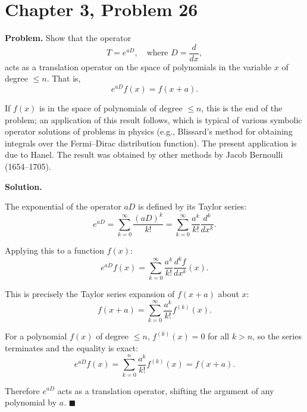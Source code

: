 \documentclass[12pt]{article}
\begin{document}
\section*{Chapter 3, Problem 26}

\textbf{Problem.} Show that the operator
\[
T = e^{aD}, \quad \text{where } D = \frac{d}{dx},
\]
acts as a translation operator on the space of polynomials in the variable $x$ of degree $\le n$. That is,
\[
e^{aD}f(x) = f(x + a).
\]

If $f(x)$ is in the space of polynomials of degree $\le n$, this is the end of the problem; an application of this result follows, which is typical of various symbolic operator solutions of problems in physics (e.g., Blissard's method for obtaining integrals over the Fermi--Dirac distribution function). The present application is due to Hanel. The result was obtained by other methods by Jacob Bernoulli (1654--1705).

\bigskip
\textbf{Solution.}

The exponential of the operator $aD$ is defined by its Taylor series:
\[
e^{aD} = \sum_{k=0}^{\infty} \frac{(aD)^k}{k!} = \sum_{k=0}^{\infty} \frac{a^k}{k!}\frac{d^k}{dx^k}.
\]

Applying this to a function $f(x)$:
\[
e^{aD}f(x) = \sum_{k=0}^{\infty} \frac{a^k}{k!}\frac{d^k f}{dx^k}(x).
\]

This is precisely the Taylor series expansion of $f(x+a)$ about $x$:
\[
f(x + a) = \sum_{k=0}^{\infty} \frac{a^k}{k!} f^{(k)}(x).
\]

For a polynomial $f(x)$ of degree $\le n$, $f^{(k)}(x) = 0$ for all $k > n$, so the series terminates and the equality is exact:
\[
e^{aD}f(x) = \sum_{k=0}^{n} \frac{a^k}{k!} f^{(k)}(x) = f(x + a).
\]

Therefore $e^{aD}$ acts as a translation operator, shifting the argument of any polynomial by $a$. \hfill $\blacksquare$
\end{document}
